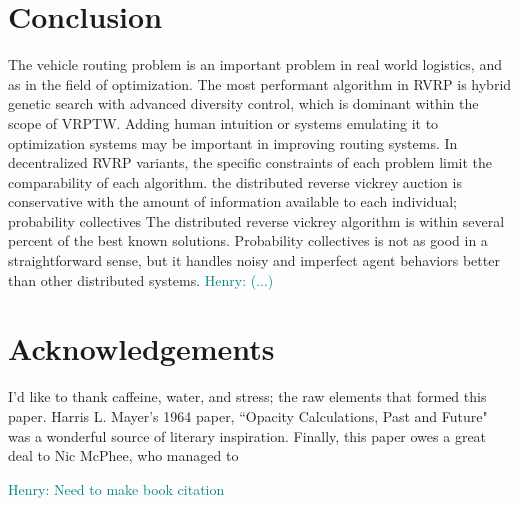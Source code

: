 \documentclass{sig-alternate}
\newcommand{\allcomments}[1]{{#1}}
\newcommand{\hfcomment}[1]{\textcolor{Teal}{\allcomments{Henry: {#1}}}}
\begin{document}
\section{Conclusion}
\label{conclusion}
The vehicle routing problem is an important problem in real world logistics, and as in the field of optimization. The most performant algorithm in RVRP is hybrid genetic search with advanced diversity control, which is dominant within the scope of VRPTW. Adding human intuition or systems emulating it to optimization systems may be important in improving routing systems. In decentralized RVRP variants, the specific constraints of each problem limit the comparability of each algorithm. the distributed reverse vickrey auction is conservative with the amount of information available to each individual; probability collectives The distributed reverse vickrey algorithm is within several percent of the best known solutions. Probability collectives is not as good in a straightforward sense, but it handles noisy and imperfect agent behaviors better than other distributed systems. 
 \hfcomment{(...)}
\section{Acknowledgements}
I'd like to thank caffeine, water, and stress; the raw elements that formed this paper. Harris L. Mayer's 1964 paper, ``Opacity Calculations, Past and Future" was a wonderful source of literary inspiration. Finally, this paper owes a great deal to Nic McPhee, who managed to 

  


\hfcomment{Need to make book citation}
\end{document}
